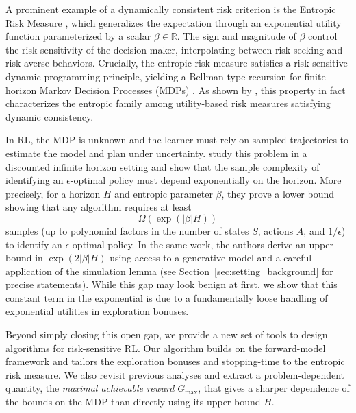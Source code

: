 \documentclass[final,12pt]{colt2026} %
\begin{document}
A prominent example of a dynamically consistent risk criterion is the Entropic Risk Measure \citep{marthe2023beyond,HowardMatheson1972}, which generalizes the expectation through an exponential utility function parameterized by a scalar $\beta \in \mathbb{R}$. The sign and magnitude of $\beta$ control the risk sensitivity of the decision maker, interpolating between risk-seeking and risk-averse behaviors. Crucially, the entropic risk measure satisfies a risk-sensitive dynamic programming principle, yielding a Bellman-type recursion for finite-horizon Markov Decision Processes (MDPs) \citep{sutton2018reinforcement}. As shown by \citet{marthe2023beyond}, this property in fact characterizes the entropic family among utility-based risk measures satisfying dynamic consistency.

In RL, the MDP is unknown and the learner must rely on sampled trajectories to estimate the model and plan under uncertainty. \citet{MortensenTalebi2025} study this problem in a discounted infinite horizon setting and show that the sample complexity of identifying an $\epsilon$-optimal policy must depend exponentially on the horizon. More precisely, for a horizon $H$ and entropic parameter $\beta$, they prove a lower bound showing that any algorithm requires at least
\[
\Omega\!\left(\exp\!\left(|\beta|H\right)\right)
\]
samples (up to polynomial factors in the number of states $S$, actions $A$, and $1/\epsilon$) to identify an $\epsilon$-optimal policy. In the same work, the authors derive an upper bound in $
\exp\!\left(2|\beta|H\right)$ 
using access to a generative model and a careful application of the simulation lemma (see Section~\ref{sec:setting_background} for precise statements). While this gap may look benign at first, we show that this constant term in the exponential is due to a fundamentally loose handling of exponential utilities in exploration bonuses. 

Beyond simply closing this open gap, we provide a new set of tools to design algorithms for risk-sensitive RL. Our algorithm builds on the forward-model framework \citep{Menard2021Fast} and tailors the exploration bonuses and stopping-time to the entropic risk measure. 
We also revisit previous analyses and extract a problem-dependent quantity, the \emph{maximal achievable reward} $G_{\max}$, that gives a sharper dependence of the bounds on the MDP than directly using its upper bound $H$. 

\end{document}
